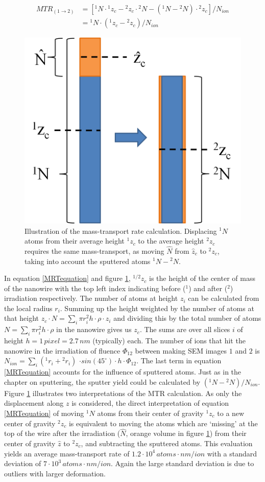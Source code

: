\begin{equation}  
\begin{split}
    MTR_{(1 \rightarrow 2)} & = [ {}^{1}N\cdot {}^{1}z_{c} -{}^{2}z_{c} \cdot {}^{2}N - ({}^{1}N - {}^{2}N) \cdot {}^{2}z_{c}]/N_{ion} \\
		& = {}^{1}N \cdot ({}^{1}z_{c} - {}^{2}z_{c})/N_{ion} 
	\label{MRTequation}
	\end{split}
\end{equation}

\begin{figure}
	\centering
		\includegraphics[width=.25\textwidth]{images/MTRillustration.png}
	\caption{Illustration of the mass-transport rate calculation. Displacing ${}^{1}N$ atoms from their average height ${}^{1}z_{c}$ to the average height ${}^{2}z_{c}$ requires the same mass-transport, as moving $\hat{N}$ from $\hat{z}_c$ to ${}^{2}z_{c}$, taking into account the sputtered atoms ${}^{1}N-{}^{2}N$.}
	\label{MTRillustration}
\end{figure}

In equation \ref{MRTequation} and figure \ref{MTRillustration}, ${}^{1/2}z_{c}$ is the height of the center of mass of the nanowire with the top left index indicating before ($^1$) and after ($^2$) irradiation respectively. The number of atoms at height $z_i$ can be calculated from the local radius $r_i$. Summing up the height weighted by the number of atoms at that height $z_{c} \cdot N = \sum_i{\pi r_i^2 h \cdot \rho \cdot z_i}$ and dividing this by the total number of atoms $N = \sum_i{\pi r_i^2 h \cdot \rho}$ in the nanowire gives us $z_{c}$. The sums are over all slices $i$ of height $h = 1\,pixel = 2.7\,nm$ (typically) each. The number of ions that hit the nanowire in the irradiation of fluence $\Phi_{12}$ between making SEM images $1$ and $2$ is $N_{ion} = \sum_i{({}^{1}r_i+{}^{2}r_i)}$ $\cdot sin(45^\circ) \cdot h \cdot \Phi_{12}$. The last term in equation \ref{MRTequation} accounts for the influence of sputtered atoms. Just as in the chapter on sputtering, the sputter yield could be calculated by $({}^{1}N - {}^{2}N)/N_{ion}$. Figure \ref{MTRillustration} illustrates two interpretations of the MTR calculation. As only the displacement along $z$ is considered, the direct interpretation of equation \ref{MRTequation} of moving ${}^{1}N$ atoms from their center of gravity ${}^{1}z_{c}$ to a new center of gravity ${}^{2}z_{c}$ is equivalent to moving the atoms which are `missing' at the top of the wire after the irradiation ($\hat{N}$, orange volume in figure \ref{MTRillustration}) from their center of gravity $\hat{z}$ to ${}^{2}z_{c}$, and subtracting the sputtered atoms. This evaluation yields an average mass-transport rate of $1.2\cdot10^4 \,atoms \cdot  nm / ion$ with a standard deviation of $7\cdot 10^3\,atoms \cdot nm / ion$. Again the large standard deviation is due to outliers with larger deformation.

